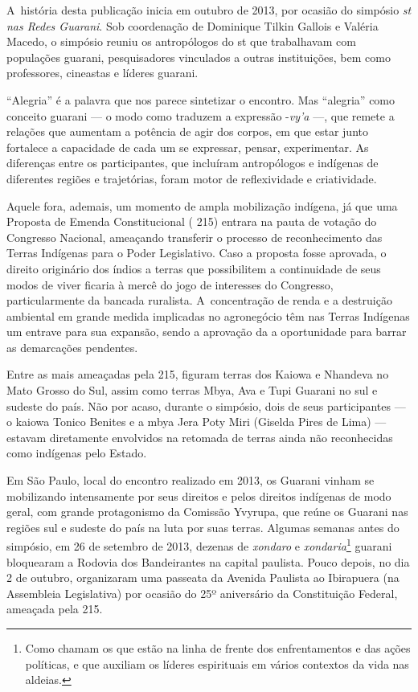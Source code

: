 A~história desta publicação inicia em outubro de 2013, por ocasião do
simpósio \emph{st nas Redes Guarani}. Sob coordenação de Dominique Tilkin
Gallois e Valéria Macedo, o simpósio reuniu os antropólogos do st
que trabalhavam com populações guarani, pesquisadores vinculados a
outras instituições, bem como professores, cineastas e líderes guarani.

``Alegria'' é a palavra que nos parece sintetizar o encontro. Mas ``alegria''
como conceito guarani --- o modo como traduzem a expressão -\emph{vy’a} ---, que
remete a relações que aumentam a potência de agir dos corpos, em que
estar junto fortalece a capacidade de cada um se expressar, pensar,
experimentar. As diferenças entre os participantes, que incluíram
antropólogos e indígenas de diferentes regiões e trajetórias, foram
motor de reflexividade e criatividade.

Aquele fora, ademais, um momento de ampla mobilização indígena, já que
uma Proposta de Emenda Constitucional ( 215) entrara na pauta de
votação do Congresso Nacional, ameaçando transferir o processo de
reconhecimento das Terras Indígenas para o Poder Legislativo. Caso a
proposta fosse aprovada, o direito originário dos índios a terras que
possibilitem a continuidade de seus modos de viver ficaria à mercê do
jogo de interesses do Congresso, particularmente da bancada ruralista.
A~concentração de renda e a destruição ambiental em grande medida
implicadas no agronegócio têm nas Terras Indígenas um entrave para sua
expansão, sendo a aprovação da  a oportunidade para barrar as
demarcações pendentes.

Entre as mais ameaçadas pela  215, figuram terras dos Kaiowa e
Nhandeva no Mato Grosso do Sul, assim como terras Mbya, Ava e Tupi
Guarani no sul e sudeste do país. Não por acaso, durante o simpósio,
dois de seus participantes --- o kaiowa Tonico Benites e a mbya Jera Poty
Miri (Giselda Pires de Lima) --- estavam diretamente envolvidos na
retomada de terras ainda não reconhecidas como indígenas pelo Estado. 

Em São Paulo, local do encontro realizado em 2013, os Guarani vinham se
mobilizando intensamente por seus direitos e pelos direitos indígenas
de modo geral, com grande protagonismo da Comissão Yvyrupa, que reúne
os Guarani nas regiões sul e sudeste do país na luta por suas terras.
Algumas semanas antes do simpósio, em 26 de setembro de 2013, dezenas
de \emph{xondaro} e \emph{xondaria}\footnote{Como chamam os que estão na linha de
frente dos enfrentamentos e das ações políticas, e que auxiliam os
líderes espirituais em vários contextos da vida nas aldeias.} guarani
bloquearam a Rodovia dos Bandeirantes na capital paulista. Pouco
depois, no dia 2 de outubro, organizaram uma passeata da Avenida
Paulista ao Ibirapuera (na Assembleia Legislativa) por ocasião do 25º
aniversário da Constituição Federal, ameaçada pela  215. 

